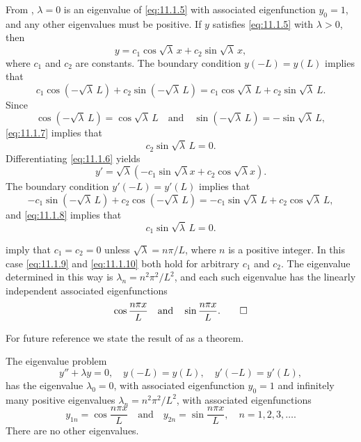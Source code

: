 \begin{solution}
From , $\lambda=0$ is an eigenvalue of
\eqref{eq:11.1.5} with associated eigenfunction $y_0=1$, and any other
eigenvalues must be positive. If $y$ satisfies \eqref{eq:11.1.5} with
$\lambda>0$, then
\begin{equation} \label{eq:11.1.6}
y=c_1\cos\sqrt\lambda\, x+c_2\sin\sqrt\lambda\, x,
\end{equation}
where $c_1$ and $c_2$ are constants.
The boundary condition $y(-L)=y(L)$ implies that
\begin{equation} \label{eq:11.1.7}
c_1\cos(-\sqrt\lambda\,L)+c_2\sin(-\sqrt\lambda\,L)=c_1\cos \sqrt\lambda\,L+c_2\sin \sqrt\lambda\,L.
\end{equation}
Since
\begin{equation} \label{eq:11.1.8}
\cos(-\sqrt\lambda\,L)=\cos \sqrt\lambda\,L\quad\text{and}\quad\sin(-\sqrt\lambda\,L)=-\sin \sqrt\lambda\,L,
\end{equation}
\eqref{eq:11.1.7} implies that
\begin{equation} \label{eq:11.1.9}
c_2\sin \sqrt\lambda\,L=0.
\end{equation}
Differentiating \eqref{eq:11.1.6} yields
\[
y'=\sqrt\lambda\left(-c_1\sin\sqrt\lambda x+c_2\cos\sqrt\lambda
x\right).
\]
The boundary condition $y'(-L)=y'(L)$  implies that
\[
-c_1\sin(-\sqrt\lambda\,L)+c_2\cos(-\sqrt\lambda\,L)=-c_1\sin \sqrt\lambda\,L+c_2\cos \sqrt\lambda\,L,
\]
and  \eqref{eq:11.1.8} implies that
\begin{equation} \label{eq:11.1.10}
c_1\sin \sqrt\lambda\,L=0.
\end{equation}

 imply that $c_1=c_2=0$ unless
$\sqrt\lambda =n\pi /L$, where $n$ is a positive integer. In this  case
\eqref{eq:11.1.9} and \eqref{eq:11.1.10} both hold for arbitrary $c_1$ and
$c_2$. The eigenvalue determined in this way is
$\lambda_n=n^2\pi^2/L^2$, and each such eigenvalue has the linearly
independent associated eigenfunctions
\[
\cos \frac{n\pi x}{L}
\quad\text{and}\quad
  \sin\frac{ n\pi x}{L}.\qedhere
\]
\end{solution}

For future reference we state the result of  as
a theorem.


\begin{theorem}\label{thmtype:11.1.6}
The eigenvalue problem
\[
y''+\lambda y=0,\quad y(-L)=y(L),\quad y'(-L)=y'(L),
\]
has the eigenvalue $\lambda_0=0$, with associated eigenfunction $y_0=1$
and  infinitely many positive eigenvalues
$\lambda_n=n^2\pi^2/L^2$,
with associated eigenfunctions
\[
y_{1n}=\cos \frac{n\pi x}{L}
\quad\text{and}\quad
y_{2n}=\sin \frac{n\pi x}{L},\quad n=1,2,3,\dots.
\]
There are no other eigenvalues.
\end{theorem}


